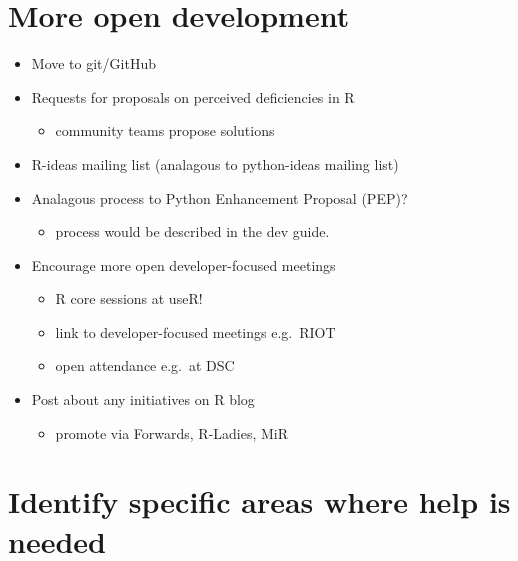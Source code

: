 \documentclass[]{book}
\providecommand{\tightlist}{%
  \setlength{\itemsep}{0pt}\setlength{\parskip}{0pt}}
\begin{document}
\hypertarget{more-open-development-1}{%
\chapter{More open development}\label{more-open-development-1}}

\begin{itemize}
\item
  Move to git/GitHub
\item
  Requests for proposals on perceived deficiencies in R

  \begin{itemize}
  \tightlist
  \item
    community teams propose solutions
  \end{itemize}
\item
  R-ideas mailing list (analagous to python-ideas mailing list)
\item
  Analagous process to Python Enhancement Proposal (PEP)?

  \begin{itemize}
  \tightlist
  \item
    process would be described in the dev guide.
  \end{itemize}
\item
  Encourage more open developer-focused meetings

  \begin{itemize}
  \tightlist
  \item
    R core sessions at useR!
  \item
    link to developer-focused meetings e.g.~RIOT
  \item
    open attendance e.g.~at DSC
  \end{itemize}
\item
  Post about any initiatives on R blog

  \begin{itemize}
  \tightlist
  \item
    promote via Forwards, R-Ladies, MiR
  \end{itemize}
\end{itemize}

\hypertarget{identify-specific-areas-where-help-is-needed}{%
\chapter{Identify specific areas where help is needed}\label{identify-specific-areas-where-help-is-needed}}
\end{document}
